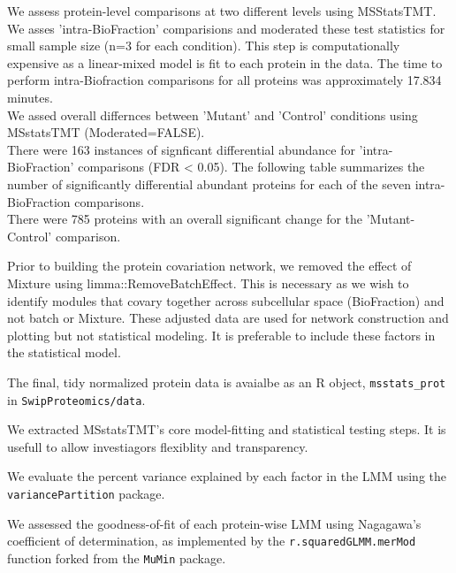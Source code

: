 \documentclass[11pt]{elife}\usepackage[]{graphicx}\usepackage[]{color}
\begin{document}
We assess protein-level comparisons at two different levels using MSStatsTMT.
We asses 'intra-BioFraction' comparisions and moderated these test statistics 
for small sample size (n=3 for each condition).
This step is computationally expensive as a linear-mixed model is fit to each
protein in the data. The time to perform intra-Biofraction comparisons for all 
proteins was approximately 17.834 minutes. \\

We assed overall differnces between 'Mutant' and 'Control' conditions using
MSstatsTMT (Moderated=FALSE). \\

There were 163 instances of signficant differential abundance for 
'intra-BioFraction' comparisons (FDR < 0.05). The following table summarizes 
the number of significantly differential abundant
proteins for each of the seven intra-BioFraction comparisons. \\


There were 785 proteins with an overall significant change for the
'Mutant-Control' comparison.


Prior to building the protein covariation network, we removed the effect of
Mixture using limma::RemoveBatchEffect. This is necessary as we wish to identify
modules that covary together across subcellular space (BioFraction) and not
batch or Mixture.  These adjusted data are used for network construction and
plotting but not statistical modeling. It is preferable to include these factors
in the statistical model.

The final, tidy normalized protein data is avaialbe as an R object, 
\texttt{msstats\_prot} in \texttt{SwipProteomics/data}.

We extracted MSstatsTMT's core model-fitting and statistical testing steps. It
is usefull to allow investiagors flexiblity and transparency. 

We evaluate the percent variance explained by each factor in the LMM using the
\texttt{variancePartition} package.



We assessed the goodness-of-fit of each protein-wise LMM using Nagagawa's
coefficient of determination, as implemented by the 
\texttt{r.squaredGLMM.merMod} function forked from the \texttt{MuMin} package.
\end{document}
